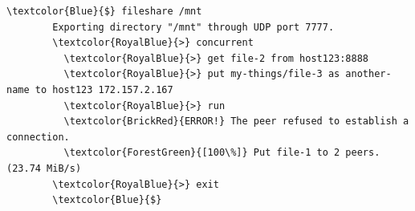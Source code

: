 \begin{itemize}[noitemsep]
    \vspace*{.9\baselineskip}
    \begin{Verbatim}[breaklines,gobble=8,frame=leftline,framesep=8pt,xleftmargin=11pt,commandchars=\\\{\}]
        \textcolor{Blue}{$} fileshare /mnt
        Exporting directory "/mnt" through UDP port 7777.
        \textcolor{RoyalBlue}{>} concurrent
          \textcolor{RoyalBlue}{>} get file-2 from host123:8888
          \textcolor{RoyalBlue}{>} put my-things/file-3 as another-name to host123 172.157.2.167
          \textcolor{RoyalBlue}{>} run
          \textcolor{BrickRed}{ERROR!} The peer refused to establish a connection.
          \textcolor{ForestGreen}{[100\%]} Put file-1 to 2 peers. (23.74 MiB/s)
        \textcolor{RoyalBlue}{>} exit
        \textcolor{Blue}{$}
    \end{Verbatim}

\end{itemize}


